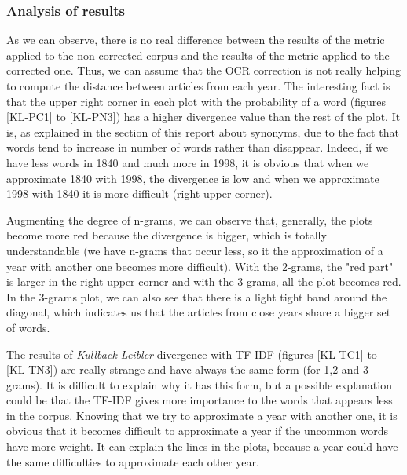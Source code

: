 \subsubsection{Analysis of results}
As we can observe, there is no real difference between the results of the metric applied to the non-corrected corpus and the results of the metric applied to the corrected one. Thus, we can assume that the OCR correction is not really helping to compute the distance between articles from each year. The interesting fact is that the upper right corner in each plot with the probability of a word (figures \ref{KL-PC1} to \ref{KL-PN3}) has a higher divergence value than the rest of the plot. It is, as explained in the section of this report about synonyms, due to the fact that words tend to increase in number of words rather than disappear. Indeed, if we have less words in 1840 and much more in 1998, it is obvious that when we approximate 1840 with 1998, the divergence is low and when we approximate 1998 with 1840 it is more difficult (right upper corner).

Augmenting the degree of n-grams, we can observe that, generally, the plots become more red because the divergence is bigger, which is totally understandable (we have n-grams that occur less, so it the approximation of a year with another one becomes more difficult). With the 2-grams, the "red part" is larger in the right upper corner and with the 3-grams, all the plot becomes red. In the 3-grams plot, we can also see that there is a light tight band around the diagonal, which indicates us that the articles from close years share a bigger set of words.

The results of \emph{Kullback-Leibler} divergence with TF-IDF (figures \ref{KL-TC1} to \ref{KL-TN3}) are really strange and have always the same form (for 1,2 and 3-grams). It is difficult to explain why it has this form, but a possible explanation could be that the TF-IDF gives more importance to the words that appears less in the corpus. Knowing that we try to approximate a year with another one, it is obvious that it becomes difficult to approximate a year if the uncommon words have more weight. It can explain the lines in the plots, because a year could have the same difficulties to approximate each other year.
